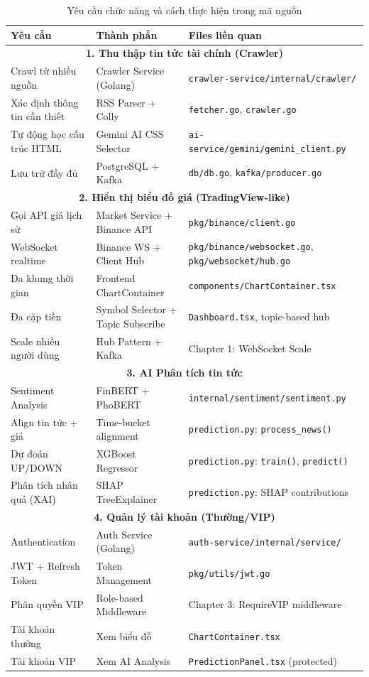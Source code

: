 \begin{table}[H]
\centering
\caption{Yêu cầu chức năng và cách thực hiện trong mã nguồn}
\begin{tabular}{|p{3.5cm}|p{4.5cm}|p{5.5cm}|}
\hline
\textbf{Yêu cầu} & \textbf{Thành phần} & \textbf{Files liên quan} \\
\hline
\multicolumn{3}{|c|}{\textbf{1. Thu thập tin tức tài chính (Crawler)}} \\
\hline
Crawl từ nhiều nguồn & Crawler Service (Golang) & \texttt{crawler-service/internal/crawler/} \\
\hline
Xác định thông tin cần thiết & RSS Parser + Colly & \texttt{fetcher.go}, \texttt{crawler.go} \\
\hline
Tự động học cấu trúc HTML & Gemini AI CSS Selector & \texttt{ai-service/gemini/gemini\_client.py} \\
\hline
Lưu trữ đầy đủ & PostgreSQL + Kafka & \texttt{db/db.go}, \texttt{kafka/producer.go} \\
\hline
\multicolumn{3}{|c|}{\textbf{2. Hiển thị biểu đồ giá (TradingView-like)}} \\
\hline
Gọi API giá lịch sử & Market Service + Binance API & \texttt{pkg/binance/client.go} \\
\hline
WebSocket realtime & Binance WS + Client Hub & \texttt{pkg/binance/websocket.go}, \texttt{pkg/websocket/hub.go} \\
\hline
Đa khung thời gian & Frontend ChartContainer & \texttt{components/ChartContainer.tsx} \\
\hline
Đa cặp tiền & Symbol Selector + Topic Subscribe & \texttt{Dashboard.tsx}, topic-based hub \\
\hline
Scale nhiều người dùng & Hub Pattern + Kafka & Chapter 1: WebSocket Scale \\
\hline
\multicolumn{3}{|c|}{\textbf{3. AI Phân tích tin tức}} \\
\hline
Sentiment Analysis & FinBERT + PhoBERT & \texttt{internal/sentiment/sentiment.py} \\
\hline
Align tin tức + giá & Time-bucket alignment & \texttt{prediction.py}: \texttt{process\_news()} \\
\hline
Dự đoán UP/DOWN & XGBoost Regressor & \texttt{prediction.py}: \texttt{train()}, \texttt{predict()} \\
\hline
Phân tích nhân quả (XAI) & SHAP TreeExplainer & \texttt{prediction.py}: SHAP contributions \\
\hline
\multicolumn{3}{|c|}{\textbf{4. Quản lý tài khoản (Thường/VIP)}} \\
\hline
Authentication & Auth Service (Golang) & \texttt{auth-service/internal/service/} \\
\hline
JWT + Refresh Token & Token Management & \texttt{pkg/utils/jwt.go} \\
\hline
Phân quyền VIP & Role-based Middleware & Chapter 3: RequireVIP middleware \\
\hline
Tài khoản thường & Xem biểu đồ & \texttt{ChartContainer.tsx} \\
\hline
Tài khoản VIP & Xem AI Analysis & \texttt{PredictionPanel.tsx} (protected) \\
\hline
\end{tabular}
\end{table}

